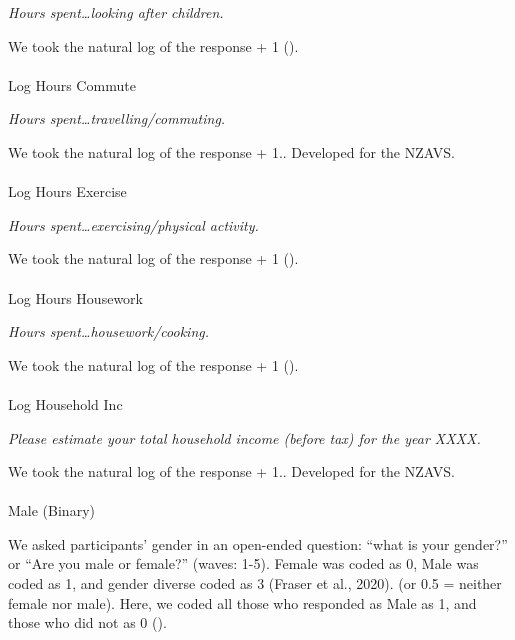\documentclass[
  single column]{article}
\makeatletter
\let\oldparagraph\paragraph
\renewcommand{\paragraph}{
    \@ifstar
      \xxxParagraphStar
      \xxxParagraphNoStar
  }
\newcommand{\xxxParagraphStar}[1]{\oldparagraph*{#1}\mbox{}}
\newcommand{\xxxParagraphNoStar}[1]{\oldparagraph{#1}\mbox{}}
\makeatother
\begin{document}
\emph{Hours spent\ldots looking after children.}

We took the natural log of the response + 1
().

\paragraph{Log Hours Commute}\label{log-hours-commute}

\emph{Hours spent\ldots travelling/commuting.}

We took the natural log of the response + 1.. Developed for the NZAVS.

\paragraph{Log Hours Exercise}\label{log-hours-exercise}

\emph{Hours spent\ldots exercising/physical activity.}

We took the natural log of the response + 1
().

\paragraph{Log Hours Housework}\label{log-hours-housework}

\emph{Hours spent\ldots housework/cooking.}

We took the natural log of the response + 1
().

\paragraph{Log Household Inc}\label{log-household-inc}

\emph{Please estimate your total household income (before tax) for the
year XXXX.}

We took the natural log of the response + 1.. Developed for the NZAVS.

\paragraph{Male (Binary)}\label{male-binary}

We asked participants' gender in an open-ended question: ``what is your
gender?'' or ``Are you male or female?'' (waves: 1-5). Female was coded
as 0, Male was coded as 1, and gender diverse coded as 3 (Fraser et al.,
2020). (or 0.5 = neither female nor male). Here, we coded all those who
responded as Male as 1, and those who did not as 0
().
\end{document}
